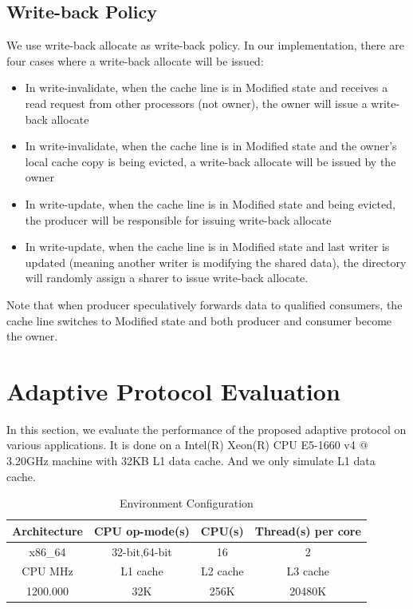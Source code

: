 \documentclass[11pt,conference]{IEEEtran}
\begin{document}
\subsection{Write-back Policy}
We use write-back allocate as write-back policy. In our implementation, there are four cases where a write-back allocate will be issued:
\begin{itemize}
  \item In write-invalidate, when the cache line is in Modified state and receives a read request from other processors (not owner), the owner will issue a write-back allocate
  \item In write-invalidate, when the cache line is in Modified state and the owner's local cache copy is being evicted, a write-back allocate will be issued by the owner
  \item In write-update, when the cache line is in Modified state and being evicted, the producer will be responsible for issuing write-back allocate
  \item In write-update, when the cache line is in Modified state and last writer is updated (meaning another writer is modifying the shared data), the directory will randomly assign a sharer to issue write-back allocate.
\end{itemize}
Note that when producer speculatively forwards data to qualified consumers, the cache line switches to Modified state and both producer and consumer become the owner.


\section{Adaptive Protocol Evaluation}
In this section, we evaluate the performance of the proposed adaptive protocol on various applications. It is done on a Intel(R) Xeon(R) CPU E5-1660 v4 @ 3.20GHz machine with 32KB L1 data cache. And we only simulate L1 data cache.

\begin{table}[!h]
\renewcommand{\arraystretch}{2.5}
\caption{Environment  Configuration}
\label{envir_config}
\centering
\begin{tabular}{|c|c|c|c|}
\hline
Architecture & CPU op-mode(s) & CPU(s) & Thread(s) per core \\
\hline
x86\_64 & 32-bit,64-bit & 16 & 2 \\
\hline
CPU MHz & L1 cache & L2 cache & L3 cache \\
\hline
1200.000 & 32K & 256K & 20480K \\
\hline
\end{tabular}
\end{table}
\FloatBarrier
\end{document}
